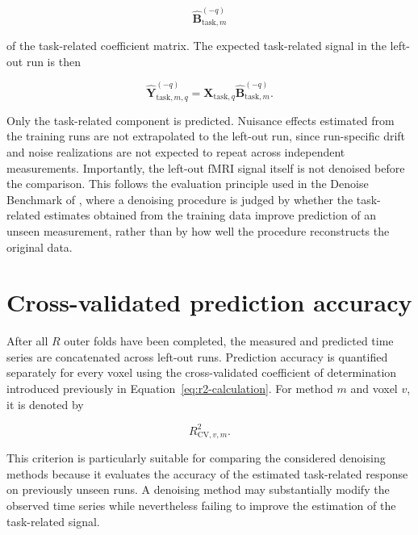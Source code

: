 \documentclass[english]{pwr_wmat_praca_dyplomowa}
\theoremstyle{definition}
\theoremstyle{remark}
\begin{document}
\begin{equation}
    \widehat{\mathbf{B}}_{\mathrm{task},m}^{(-q)}
\end{equation}

of the task-related coefficient matrix. The expected task-related signal in the left-out run is then

\begin{equation}
    \widehat{\mathbf{Y}}_{\mathrm{task},m,q}^{(-q)}
    = \mathbf{X}_{\mathrm{task},q} \widehat{\mathbf{B}}_{\mathrm{task},m}^{(-q)}.
    \label{eq:outer-cv-prediction}
\end{equation}

Only the task-related component is predicted. Nuisance effects estimated from the training runs are not extrapolated to the left-out run, since run-specific drift and noise realizations are not expected to repeat across independent measurements. Importantly, the left-out fMRI signal itself is not denoised before the comparison. This follows the evaluation principle used in the Denoise Benchmark of \cite{glm-denoise}, where a denoising procedure is judged by whether the task-related estimates obtained from the training data improve prediction of an unseen measurement, rather than by how well the procedure reconstructs the original data.


\section{Cross-validated prediction accuracy}

\label{section:evaluation-r2}

After all $R$ outer folds have been completed, the measured and predicted time series are concatenated across left-out runs. Prediction accuracy is quantified separately for every voxel using the cross-validated coefficient of determination introduced previously in Equation~\eqref{eq:r2-calculation}. For method $m$ and voxel $v$, it is denoted by

\begin{equation}
    R^2_{\mathrm{CV},v,m}.
\end{equation}

This criterion is particularly suitable for comparing the considered denoising methods because it evaluates the accuracy of the estimated task-related response on previously unseen runs. A denoising method may substantially modify the observed time series while nevertheless failing to improve the estimation of the task-related signal.
\end{document}
